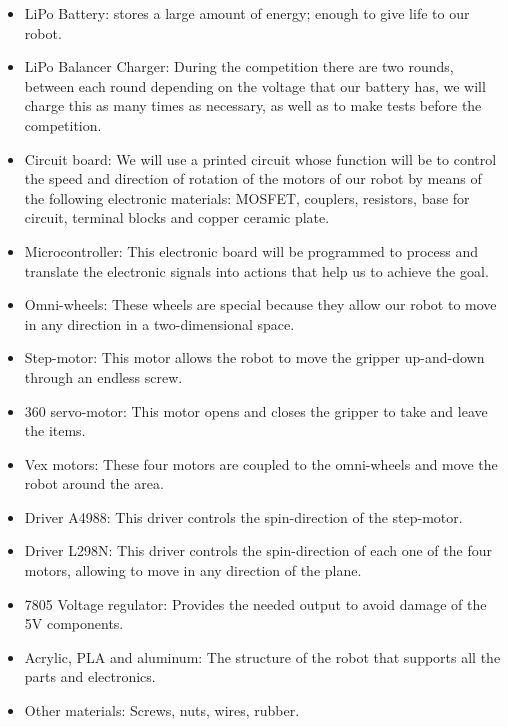 \documentclass[preprint,12pt,3p]{elsarticle}
\begin{document}
\begin{itemize}
    \item LiPo Battery: stores a large amount of energy; enough to give life to our robot. 
    
    \item LiPo Balancer Charger: During the competition there are two rounds, between each round depending on the voltage that our battery has, we will charge this as many times as necessary, as well as to make tests before the competition.
    
    \item Circuit board: We will use a printed circuit whose function will be to control the speed and direction of rotation of the motors of our robot by means of the following electronic materials: MOSFET, couplers, resistors, base for circuit, terminal blocks and copper ceramic plate.

    \item Microcontroller: This electronic board will be programmed to process and translate the electronic signals into actions that help us to achieve the goal.

    \item Omni-wheels: These wheels are special because they allow our robot to move in any direction in a two-dimensional space.

    \item Step-motor: This motor allows the robot to move the gripper up-and-down through an endless screw.

    \item 360\degree \hspace{0.05cm} servo-motor: This motor opens and closes the gripper to take and leave the items.

    \item Vex motors: These four motors are coupled to the omni-wheels and move the robot around the area.

    \item Driver A4988: This driver controls the spin-direction of the step-motor.

    \item Driver L298N: This driver controls the spin-direction of each one of the four motors, allowing to move in any direction of the plane.

    \item 7805 Voltage regulator: Provides the needed output to avoid damage of the 5V components.

    \item Acrylic, PLA and aluminum: The structure of the robot that supports all the parts and electronics.

    \item Other materials: Screws, nuts, wires, rubber.

\end{itemize}
\end{document}

